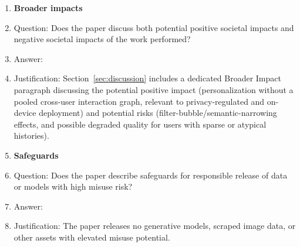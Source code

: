 \documentclass{article}
\begin{document}
\begin{enumerate}
\item {\bf Broader impacts}
    \item[] Question: Does the paper discuss both potential positive societal impacts and negative societal impacts of the work performed?
    \item[] Answer: \answerYes{}
    \item[] Justification: Section~\ref{sec:discussion} includes a dedicated Broader Impact paragraph discussing the potential positive impact (personalization without a pooled cross-user interaction graph, relevant to privacy-regulated and on-device deployment) and potential risks (filter-bubble/semantic-narrowing effects, and possible degraded quality for users with sparse or atypical histories).

\item {\bf Safeguards}
    \item[] Question: Does the paper describe safeguards for responsible release of data or models with high misuse risk?
    \item[] Answer: \answerNA{}
    \item[] Justification: The paper releases no generative models, scraped image data, or other assets with elevated misuse potential.


\end{enumerate}
\end{document}
